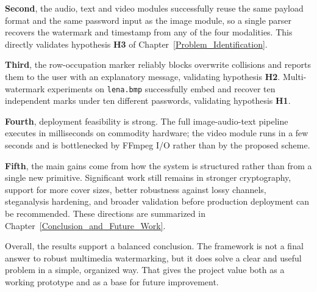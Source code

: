 \textbf{Second}, the audio, text and video modules successfully reuse the same payload format and the same password input as the image module, so a single parser recovers the watermark and timestamp from any of the four modalities. This directly validates hypothesis \textbf{H3} of Chapter~\ref{Problem_Identification}.

\textbf{Third}, the row-occupation marker reliably blocks overwrite collisions and reports them to the user with an explanatory message, validating hypothesis \textbf{H2}. Multi-watermark experiments on \texttt{lena.bmp} successfully embed and recover ten independent marks under ten different passwords, validating hypothesis \textbf{H1}.

\textbf{Fourth}, deployment feasibility is strong. The full image-audio-text pipeline executes in milliseconds on commodity hardware; the video module runs in a few seconds and is bottlenecked by FFmpeg I/O rather than by the proposed scheme.

\textbf{Fifth}, the main gains come from how the system is structured rather than from a single new primitive. Significant work still remains in stronger cryptography, support for more cover sizes, better robustness against lossy channels, steganalysis hardening, and broader validation before production deployment can be recommended. These directions are summarized in Chapter~\ref{Conclusion_and_Future_Work}.

Overall, the results support a balanced conclusion. The framework is not a final answer to robust multimedia watermarking, but it does solve a clear and useful problem in a simple, organized way. That gives the project value both as a working prototype and as a base for future improvement.
